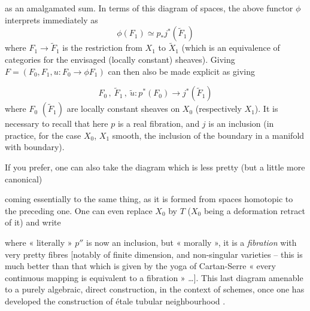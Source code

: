 \documentclass[11pt,a4paper]{article}
\begin{document}
as an amalgamated sum. In terms of this diagram of spaces, the above functor $\phi$ interprets immediately as
\[
\phi(F_1) \simeq p_*j^*(\tilde{F}_1)
\]
where $F_1 \to \tilde{F}_1$ is the restriction from $X_1$ to $\tilde{X}_1$ (which is an equivalence of categories for the envisaged (locally constant) sheaves). Giving $F = (F_0, F_1, u : F_0 \to \phi F_1)$ can then also be made explicit as giving

\[
F_0 \,,\ \tilde{F}_1 \,,\ \tilde{u} : p^*(F_0) \to j^*(\tilde{F}_1)
\]
where $F_0$ $(\tilde{F}_1)$ are locally constant sheaves on $X_0$ (respectively $X_1$). It is necessary to recall that  here $p$ is a real fibration, and $j$ is an inclusion (in practice, \struck{\ill{}} for the case $X_0$, $X_1$ smooth, \struck{\ill{}} the inclusion of the boundary in a manifold with boundary).

If you prefer, one can also take the diagram which is less pretty (but a little more canonical)


coming essentially to the same thing, as it is formed from spaces homotopic to the preceding one. One can even replace $X_0$ by $T$ ($X_0$ being a deformation retract of it) and write


where « literally » $p''$ is now an inclusion, but « morally », it is a \emph{fibration} with  very pretty fibres [notably  of finite dimension, and   non-singular varieties -- this is \struck{\ill{}} much better than that which is given by the yoga of Cartan-Serre « every continuous mapping is equivalent to a fibration » …]. This last diagram   amenable to a purely algebraic, direct construction, in the context of schemes, once one has developed the construction of étale tubular neighbourhood .
\end{document}
